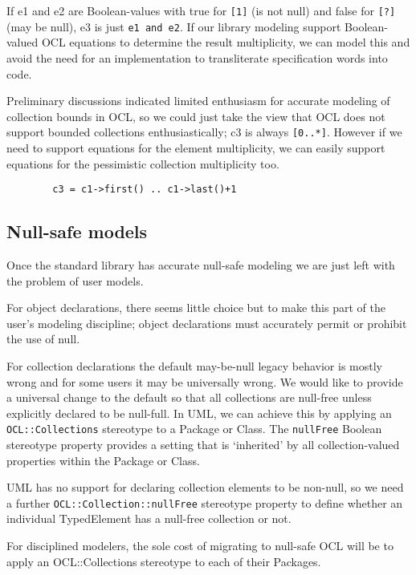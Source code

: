 \documentclass{llncs}
\begin{document}
If e1 and e2 are Boolean-values with true for \verb$[1]$ (is not null) and false for \verb$[?]$ (may be null), e3 is just \verb$e1 and e2$. If our library modeling support Boolean-valued OCL equations to determine the result multiplicity, we can model this and avoid the need for an implementation to transliterate specification words into code.

Preliminary discussions indicated limited enthusiasm for accurate modeling of collection bounds in OCL, so we could just take the view that OCL does not support bounded collections enthusiastically; c3 is always \verb$[0..*]$. However if we need to support equations for the element multiplicity, we can easily support equations for the pessimistic collection multiplicity too. 

\begin{verbatim}
        c3 = c1->first() .. c1->last()+1
\end{verbatim}

\subsection{Null-safe models}    
      
Once the standard library has accurate null-safe modeling we are just left with the problem of user models.

For object declarations, there seems little choice but to make this part of the user's modeling discipline; object declarations must accurately permit or prohibit the use of null.

For collection declarations the default may-be-null legacy behavior is mostly wrong and for some users it may be universally wrong. We would like to provide a universal change to the default so that all collections are null-free unless explicitly declared to be null-full. In UML, we can achieve this by applying an \verb$OCL::Collections$ stereotype to a Package or Class. The \verb$nullFree$ Boolean stereotype property provides a setting that is `inherited' by all collection-valued properties within the Package or Class.

UML has no support for declaring collection elements to be non-null, so we need a further \verb$OCL::Collection::nullFree$ stereotype property to define whether an individual TypedElement has a null-free collection or not.

For disciplined modelers, the sole cost of migrating to null-safe OCL will be to apply an OCL::Collections stereotype to each of their Packages.
\end{document}
